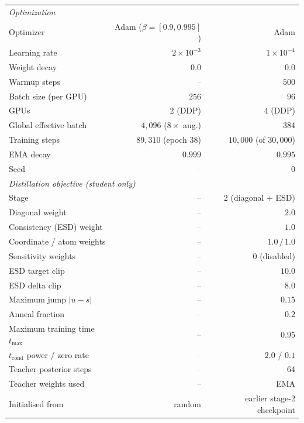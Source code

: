 \documentclass[11pt]{article}
\newcommand{\naa}{\textcolor{gray}{--}}
\begin{document}
\begin{table}[h]
\begin{tabular}{lrr}
\midrule
\multicolumn{3}{l}{\emph{Optimization}} \\
Optimizer                      & Adam ($\beta=[0.9,0.995]$) & Adam \\
Learning rate                  & $2\times10^{-3}$ & $1\times10^{-4}$ \\
Weight decay                   & $0.0$ & $0.0$ \\
Warmup steps                   & \naa & $500$ \\
Batch size (per GPU)           & $256$ & $96$ \\
GPUs                           & $2$ (DDP) & $4$ (DDP) \\
Global effective batch         & $4{,}096$ ($8\times$ aug.) & $384$ \\
Training steps                 & $89{,}310$ (epoch $38$) & $10{,}000$ (of $30{,}000$) \\
EMA decay                      & $0.999$ & $0.995$ \\
Seed                           & \naa & $0$ \\
\midrule
\multicolumn{3}{l}{\emph{Distillation objective (student only)}} \\
Stage                          & \naa & 2 (diagonal $+$ ESD) \\
Diagonal weight                & \naa & $2.0$ \\
Consistency (ESD) weight       & \naa & $1.0$ \\
Coordinate / atom weights      & \naa & $1.0\,/\,1.0$ \\
Sensitivity weights            & \naa & $0$ (disabled) \\
ESD target clip                & \naa & $10.0$ \\
ESD delta clip                 & \naa & $8.0$ \\
Maximum jump $|u-s|$           & \naa & $0.15$ \\
Anneal fraction                & \naa & $0.2$ \\
Maximum training time $t_{\max}$ & \naa & $0.95$ \\
$t_{\mathrm{cond}}$ power / zero rate & \naa & $2.0$ / $0.1$ \\
Teacher posterior steps        & \naa & $64$ \\
Teacher weights used           & \naa & EMA \\
Initialised from               & random & earlier stage-2 checkpoint \\
\bottomrule
\end{tabular}
\end{table}
\end{document}
